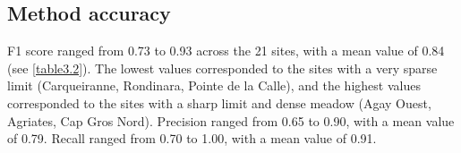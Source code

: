 \subsection{Method accuracy}
F1 score ranged from 0.73 to 0.93 across the 21 sites, with a mean value of 0.84 (see \autoref{table3.2}). The lowest values corresponded to the sites with a very sparse limit (Carqueiranne, Rondinara, Pointe de la Calle), and the highest values corresponded to the sites with a sharp limit and dense meadow (Agay Ouest, Agriates, Cap Gros Nord). Precision ranged from 0.65 to 0.90, with a mean value of 0.79. Recall ranged from 0.70 to 1.00, with a mean value of 0.91.

